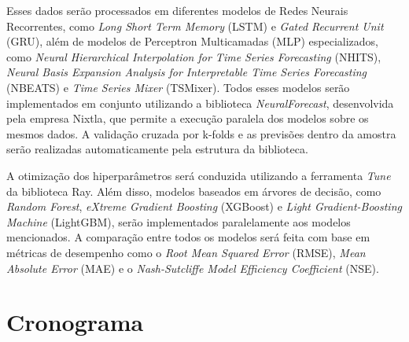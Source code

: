 \documentclass[
	12pt,				%
	openright,			%
	a4paper,			%
	english,			%
	french,				%
	spanish,			%
	brazil				%
	]{article}
\begin{document}
Esses dados serão processados em diferentes modelos de Redes Neurais Recorrentes, como \textit{Long Short Term Memory} (LSTM)\cite{hochreiter} e \textit{Gated Recurrent Unit} (GRU)\cite{kyunghyun}, além de modelos de Perceptron Multicamadas (MLP) especializados, como \textit{Neural Hierarchical Interpolation for Time Series Forecasting} (NHITS)\cite{challu}, \textit{Neural Basis Expansion Analysis for Interpretable Time Series Forecasting} (NBEATS)\cite{oreshkin} e \textit{Time Series Mixer} (TSMixer)\cite{chen}. Todos esses modelos serão implementados em conjunto utilizando a biblioteca \textit{NeuralForecast}, desenvolvida pela empresa Nixtla\cite{neuralforecast}, que permite a execução paralela dos modelos sobre os mesmos dados. A validação cruzada por k-folds e as previsões dentro da amostra serão realizadas automaticamente pela estrutura da biblioteca.

A otimização dos hiperparâmetros será conduzida utilizando a ferramenta \textit{Tune} da biblioteca Ray\cite{tune}. Além disso, modelos baseados em árvores de decisão, como \textit{Random Forest}\cite{ho}, \textit{eXtreme Gradient Boosting} (XGBoost)\cite{chen_xgboost} e \textit{Light Gradient-Boosting Machine} (LightGBM)\cite{lightgbm}, serão implementados paralelamente aos modelos mencionados. A comparação entre todos os  modelos será feita com base em métricas de desempenho como o \textit{Root Mean Squared Error} (RMSE), \textit{Mean Absolute Error} (MAE) e o \textit{Nash-Sutcliffe Model Efficiency Coefficient} (NSE).
\bigskip

\section{Cronograma}
\end{document}
